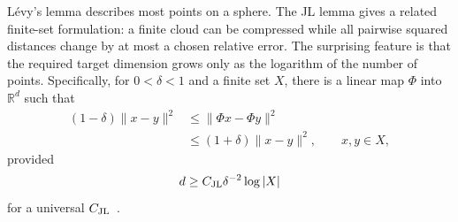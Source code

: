 \documentclass[
  aps,
  reprint,
  superscriptaddress,
  floatfix,
  nofootinbib,
  longbibliography
]{revtex4-2}
\newcommand{\R}{\mathbb{R}}
\newcommand{\norm}[1]{\lVert #1 \rVert}
\begin{document}
L\'evy's lemma describes most points on a sphere.  The JL lemma gives a related
finite-set formulation: a finite cloud can be compressed while all pairwise
squared distances change by at most a chosen relative error.  The surprising
feature is that the required target dimension grows only as the logarithm of
the number of points.  Specifically, for
$0<\delta<1$ and a finite set $X$, there is a linear map
$\Phi$ into $\R^d$ such that
\begin{equation}
\label{eq:jl}
\begin{aligned}
(1-\delta)\norm{x-y}^2
&\leq\norm{\Phi x-\Phi y}^2\\
&\leq(1+\delta)\norm{x-y}^2,
\qquad x,y\in X,
\end{aligned}
\end{equation}
provided
\begin{equation}
\label{eq:jl-dimension}
d\geq C_{\rm JL}\delta^{-2}\log |X|
\end{equation}
for a universal $C_{\rm JL}$~\cite{johnson-1984,Dasgupta-2003}.
\end{document}
